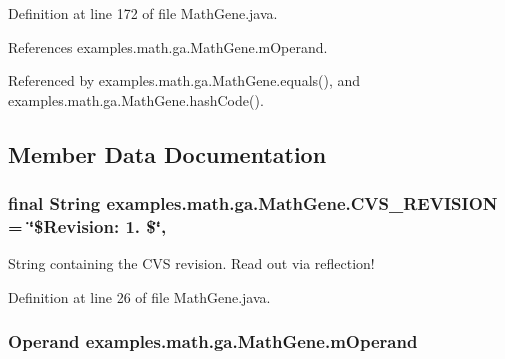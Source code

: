 Definition at line 172 of file Math\-Gene.\-java.



References examples.\-math.\-ga.\-Math\-Gene.\-m\-Operand.



Referenced by examples.\-math.\-ga.\-Math\-Gene.\-equals(), and examples.\-math.\-ga.\-Math\-Gene.\-hash\-Code().



\subsection{Member Data Documentation}
\hypertarget{classexamples_1_1math_1_1ga_1_1_math_gene_a509b38c71a048d55425eb1066f4a61d7}{
\subsubsection[{C\-V\-S\-\_\-\-R\-E\-V\-I\-S\-I\-O\-N}]{\setlength{\rightskip}{0pt plus 5cm}final String examples.\-math.\-ga.\-Math\-Gene.\-C\-V\-S\-\_\-\-R\-E\-V\-I\-S\-I\-O\-N = \char`\"{}\$Revision\-: 1. \$\char`\"{}\hspace{0.3cm}{\ttfamily [static]}, {\ttfamily [private]}}}\label{classexamples_1_1math_1_1ga_1_1_math_gene_a509b38c71a048d55425eb1066f4a61d7}
String containing the C\-V\-S revision. Read out via reflection! 

Definition at line 26 of file Math\-Gene.\-java.

\hypertarget{classexamples_1_1math_1_1ga_1_1_math_gene_acac7063050fff879714848da92effe43}{
\subsubsection[{m\-Operand}]{\setlength{\rightskip}{0pt plus 5cm}Operand examples.\-math.\-ga.\-Math\-Gene.\-m\-Operand\hspace{0.3cm}{\ttfamily [private]}}}\label{classexamples_1_1math_1_1ga_1_1_math_gene_acac7063050fff879714848da92effe43}



